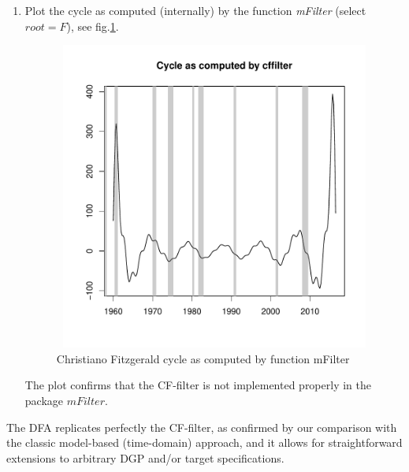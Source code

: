 \documentclass[a4paper]{book}
\begin{document}
\begin{enumerate}
\item Plot the cycle as computed (internally) by the function \emph{mFilter} (select $root=F$), see fig.\ref{z_HP_us_real_log_gdp_cf_cycle}.
\begin{Schunk}
\end{Schunk}
\begin{figure}[H]\begin{center}\includegraphics[height=4in, width=6in]{z_HP_us_real_log_gdp_cf_cycle}\caption{Christiano Fitzgerald cycle as computed by function mFilter\label{z_HP_us_real_log_gdp_cf_cycle}}\end{center}\end{figure}The plot confirms that the CF-filter is not implemented properly in the package $mFilter$. 
\end{enumerate}
The DFA replicates perfectly the CF-filter, as confirmed by our comparison with the classic model-based (time-domain) approach, and it allows for straightforward extensions to arbitrary DGP and/or target specifications.   
\end{document}
